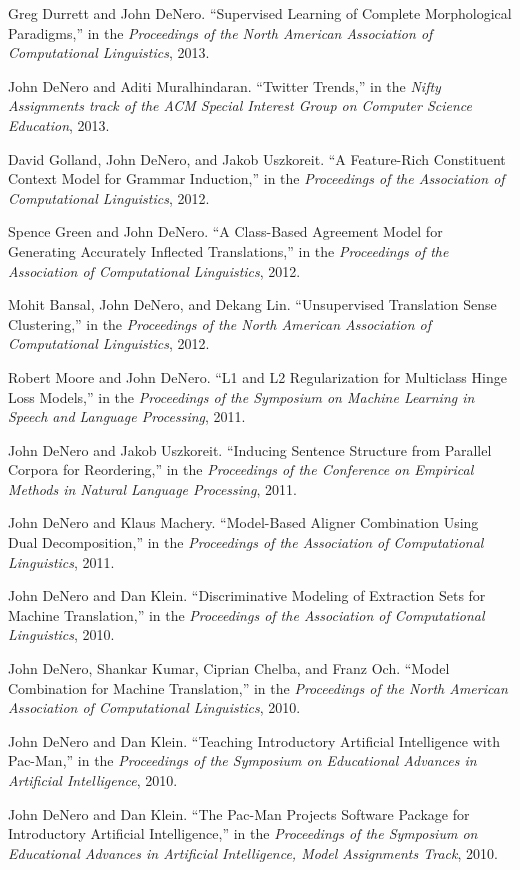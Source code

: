 \documentclass[margin,line]{res}
\begin{document}
\begin{resume}
Greg Durrett and John DeNero.  ``Supervised Learning of Complete Morphological Paradigms,'' in the {\it Proceedings of the North American Association of Computational Linguistics}, 2013.

John DeNero and Aditi Muralhindaran.  ``Twitter Trends,'' in the {\it Nifty Assignments track of the ACM Special Interest Group on Computer Science Education}, 2013.

David Golland, John DeNero, and Jakob Uszkoreit. ``A Feature-Rich Constituent Context Model for Grammar Induction,'' in the {\it Proceedings of the Association of Computational Linguistics}, 2012.

Spence Green and John DeNero. ``A Class-Based Agreement Model for Generating Accurately Inflected Translations,'' in the {\it Proceedings of the Association of Computational Linguistics}, 2012.

Mohit Bansal, John DeNero, and Dekang Lin. ``Unsupervised Translation Sense Clustering,'' in the {\it Proceedings of the North American Association of Computational Linguistics}, 2012.

Robert Moore and John DeNero. ``L1 and L2 Regularization for Multiclass Hinge Loss Models,'' in the {\it Proceedings of the Symposium on Machine Learning in Speech and Language Processing}, 2011.

John DeNero and Jakob Uszkoreit.  ``Inducing Sentence Structure from Parallel Corpora for Reordering,'' in the {\it Proceedings of the Conference on Empirical Methods in Natural Language Processing}, 2011.

John DeNero and Klaus Machery. ``Model-Based Aligner Combination Using Dual Decomposition,'' in the {\it Proceedings of the Association of Computational Linguistics}, 2011.

John DeNero and Dan Klein. ``Discriminative Modeling of Extraction Sets for Machine Translation,'' in the {\it Proceedings of the Association of Computational Linguistics}, 2010.

John DeNero, Shankar Kumar, Ciprian Chelba, and Franz Och. ``Model Combination for Machine Translation,'' in the {\it Proceedings of the North American Association of Computational Linguistics}, 2010.

John DeNero and Dan Klein. ``Teaching Introductory Artificial Intelligence with Pac-Man,'' in the {\it Proceedings of the Symposium on Educational Advances in Artificial Intelligence}, 2010.

John DeNero and Dan Klein. ``The Pac-Man Projects Software Package for Introductory Artificial Intelligence,'' in the {\it Proceedings of the Symposium on Educational Advances in Artificial Intelligence, Model Assignments Track}, 2010.


\end{resume}
\end{document}
